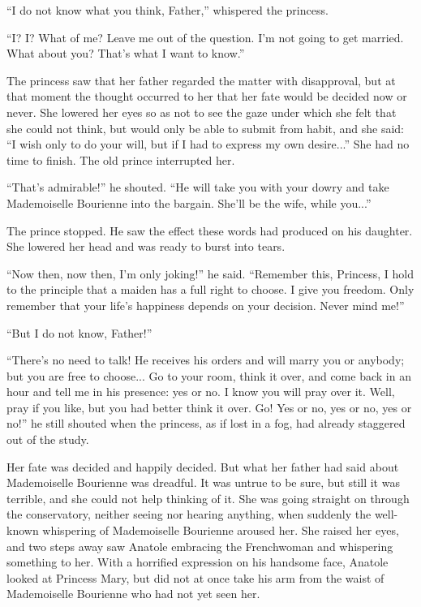 ``I do not know what you think, Father,'' whispered the princess.

``I? I? What of me? Leave me out of the question. I'm not going
to get married. What about you? That's what I want to know.''

The princess saw that her father regarded the matter with
disapproval, but at that moment the thought occurred to her that
her fate would be decided now or never. She lowered her eyes so
as not to see the gaze under which she felt that she could not
think, but would only be able to submit from habit, and she said:
``I wish only to do your will, but if I had to express my own
desire...'' She had no time to finish. The old prince interrupted
her.

``That's admirable!'' he shouted. ``He will take you with your
dowry and take Mademoiselle Bourienne into the bargain. She'll be
the wife, while you...''

The prince stopped. He saw the effect these words had produced on
his daughter. She lowered her head and was ready to burst into
tears.

``Now then, now then, I'm only joking!'' he said. ``Remember
this, Princess, I hold to the principle that a maiden has a full
right to choose. I give you freedom. Only remember that your
life's happiness depends on your decision. Never mind me!''

``But I do not know, Father!''

``There's no need to talk! He receives his orders and will marry
you or anybody; but you are free to choose... Go to your room,
think it over, and come back in an hour and tell me in his
presence: yes or no. I know you will pray over it. Well, pray if
you like, but you had better think it over. Go! Yes or no, yes or
no, yes or no!'' he still shouted when the princess, as if lost
in a fog, had already staggered out of the study.

Her fate was decided and happily decided. But what her father had
said about Mademoiselle Bourienne was dreadful. It was untrue to
be sure, but still it was terrible, and she could not help
thinking of it. She was going straight on through the
conservatory, neither seeing nor hearing anything, when suddenly
the well-known whispering of Mademoiselle Bourienne aroused
her. She raised her eyes, and two steps away saw Anatole
embracing the Frenchwoman and whispering something to her. With a
horrified expression on his handsome face, Anatole looked at
Princess Mary, but did not at once take his arm from the waist of
Mademoiselle Bourienne who had not yet seen her.

